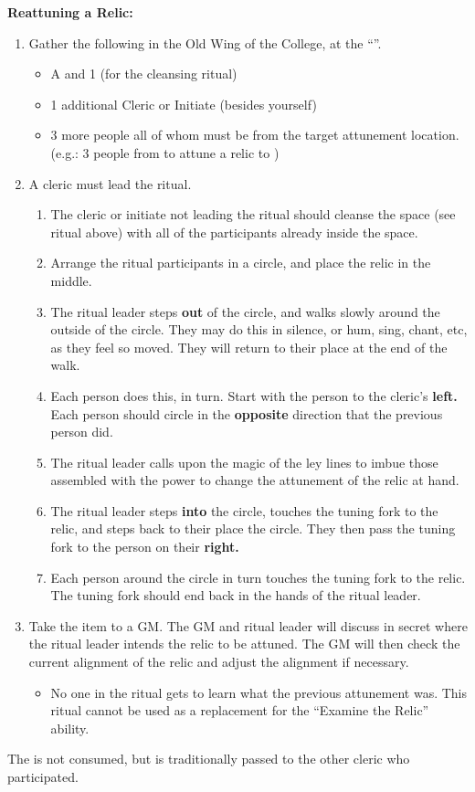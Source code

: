 \documentclass[green]{GL2020}
\begin{document}
\textbf{Reattuning a Relic:}
  \begin{enumerate}
    \item Gather the following in the Old Wing of the College, at the ``\sLeyLinesNexus{}''.
    \begin{itemize}
      \item A \iTuningFork{} and 1 \iRitualCandle{} (for the cleansing ritual)
      \item 1 additional Cleric or Initiate (besides yourself)
      \item 3 more people all of whom must be  from the target attunement location. (e.g.: 3 people from \pTech{} to attune a relic to \pTech{})
    \end{itemize}
    \item A cleric must lead the ritual.
    \begin{enumerate}
      \item The cleric or initiate not leading the ritual should cleanse the space (see ritual above) with all of the participants already inside the space.
      \item Arrange the ritual participants in a circle, and place the relic in the middle.
      \item The ritual leader steps \textbf{out} of the circle, and walks slowly around the outside of the circle. They may do this in silence, or hum, sing, chant, etc, as they feel so moved. They will return to their place at the end of the walk.
      \item Each person does this, in turn. Start with the person to the cleric’s \textbf{left.} Each person should circle in the \textbf{opposite} direction that the previous person did.
      \item The ritual leader calls upon the magic of the ley lines to imbue those assembled with the power to change the attunement of the relic at hand.
      \item The ritual leader steps \textbf{into} the circle, touches the tuning fork to the relic, and steps back to their place the circle. They then pass the tuning fork to the person on their \textbf{right.}
      \item Each person around the circle in turn touches the tuning fork to the relic. The tuning fork should end back in the hands of the ritual leader.
    \end{enumerate}
    \item Take the item to a GM. The GM and ritual leader will discuss in secret where the ritual leader intends the relic to be attuned. The GM will then check the current alignment of the relic and adjust the alignment if necessary.
    \begin{itemize}
      \item No one in the ritual gets to learn what the previous attunement was. This ritual cannot be used as a replacement for the ``Examine the Relic'' ability.
    \end{itemize}
  \end{enumerate}
The \iTuningFork{} is not consumed, but is traditionally passed to the other cleric who participated.
   
\end{document}

